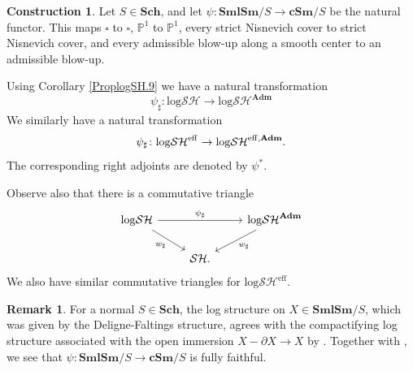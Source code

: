 \documentclass[11pt, a4paper]{amsart}
\theoremstyle{definition}
\newtheorem{const}[thm]{Construction}
\newtheorem{rmk}[thm]{Remark}
\numberwithin{equation}{subsection}
\renewcommand{\P}{\mathbb{P}}
\newcommand{\Sch}{\mathbf{Sch}}
\newcommand{\cSm}{\mathbf{cSm}}
\newcommand{\SmlSm}{\mathbf{SmlSm}}
\newcommand{\Adm}{\mathbf{Adm}}
\newcommand{\sharpp}{\sharp}
\newcommand{\boxx}{\square}
\newcommand{\eff}{{\rm eff}}
\newcommand{\infSH}{\mathcal{SH}}
\newcommand{\inflogSH}{\mathrm{log}\mathcal{SH}}
\newcommand{\inflogSHS}{\mathrm{log}\mathcal{SH}^{\mathrm{eff}}}
\begin{document}
\begin{const}
\label{compth.14}
Let $S\in \Sch$, and let $\psi\colon \SmlSm/S\to \cSm/S$ be the natural functor.
This maps $\boxx$ to $\boxx$, $\P^1$ to $\P^1$, every strict Nisnevich cover to strict Nisnevich cover, 
and every admissible blow-up along a smooth center to an admissible blow-up.

Using Corollary \ref{ProplogSH.9}
we have a natural transformation
\[
\psi_\sharpp
\colon
\inflogSH
\to
\inflogSH^\Adm
\]
We similarly have a natural transformation
\[
\psi_\sharpp \colon \inflogSHS \to {\inflogSH}^{\eff,\Adm}.
\]
The corresponding right adjoints are denoted by $\psi^*$.

Observe also that there is a commutative triangle
\begin{equation}
\label{compth.14.1}
\begin{tikzcd}
\inflogSH\ar[rd,"w_\sharp"']\ar[rr,"\psi_\sharp"]&
&
\inflogSH^\Adm\ar[ld,"w_\sharp"]
\\
&
\infSH.
\end{tikzcd}
\end{equation}
We also have similar commutative triangles for $\inflogSHS$.
\end{const}

\begin{rmk}
For a normal $S\in \Sch$,
the log structure on $X\in \SmlSm/S$, which was given by the Deligne-Faltings structure, agrees with the compactifying log structure associated with the open immersion $X-\partial X\to X$ by \cite[Proposition III.1.7.3(4)]{Ogu}.
Together with \cite[Proposition III.1.6.2]{Ogu},
we see that $\psi\colon \SmlSm/S\to \cSm/S$ is fully faithful.
\end{rmk}
\end{document}
